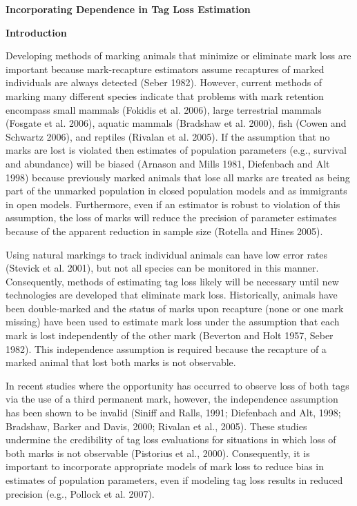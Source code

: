 \documentclass{article}
\begin{document}
\begin{center}
\textbf{Incorporating Dependence in Tag Loss Estimation}
\end{center}

\textbf{Introduction}

Developing methods of marking animals that minimize or eliminate mark loss 
are important because mark-recapture estimators assume recaptures of marked 
individuals are always detected (Seber 1982). However, current methods of 
marking many different species indicate that problems with mark retention 
encompass small mammals (Fokidis et al. 2006), large terrestrial mammals 
(Fosgate et al. 2006), aquatic mammals (Bradshaw et al. 2000), fish (Cowen 
and Schwartz 2006), and reptiles (Rivalan et al. 2005). If the assumption 
that no marks are lost is violated then estimates of population parameters 
(e.g., survival and abundance) will be biased (Arnason and Mills 1981, 
Diefenbach and Alt 1998) because previously marked animals that lose all 
marks are treated as being part of the unmarked population in closed 
population models and as immigrants in open models. Furthermore, even if an 
estimator is robust to violation of this assumption, the loss of marks will 
reduce the precision of parameter estimates because of the apparent 
reduction in sample size (Rotella and Hines 2005).

Using natural markings to track individual animals can have low error rates 
(Stevick et al. 2001), but not all species can be monitored in this manner. 
Consequently, methods of estimating tag loss likely will be necessary until 
new technologies are developed that eliminate mark loss. Historically, 
animals have been double-marked and the status of marks upon recapture (none 
or one mark missing) have been used to estimate mark loss under the 
assumption that each mark is lost independently of the other mark (Beverton 
and Holt 1957, Seber 1982). This independence assumption is required because 
the recapture of a marked animal that lost both marks is not observable.

In recent studies where the opportunity has occurred to observe loss of both 
tags via the use of a third permanent mark, however, the independence 
assumption has been shown to be invalid (Siniff and Ralls, 1991; Diefenbach 
and Alt, 1998; Bradshaw, Barker and Davis, 2000; Rivalan et al., 2005). 
These studies undermine the credibility of tag loss evaluations for 
situations in which loss of both marks is not observable (Pistorius et al., 
2000). Consequently, it is important to incorporate appropriate models of 
mark loss to reduce bias in estimates of population parameters, even if 
modeling tag loss results in reduced precision (e.g., Pollock et al. 2007).
\end{document}
